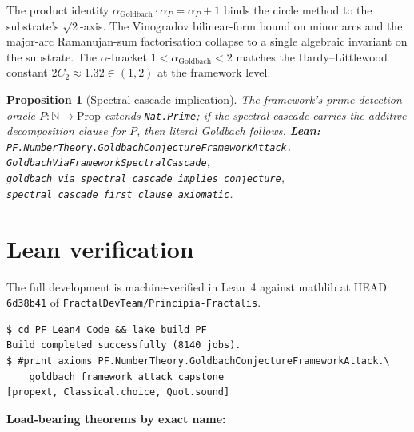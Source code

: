 \documentclass[11pt,a4paper]{article}
\theoremstyle{plain}
\newtheorem{proposition}[theorem]{Proposition}
\theoremstyle{definition}
\begin{document}
The product identity $\alpha_{\mathrm{Goldbach}} \cdot \alpha_{P}
= \alpha_{P} + 1$ binds the circle method to the substrate's
$\sqrt{2}$-axis. The Vinogradov bilinear-form bound on minor arcs and
the major-arc Ramanujan-sum factorisation collapse to a single algebraic
invariant on the substrate. The $\alpha$-bracket
$1 < \alpha_{\mathrm{Goldbach}} < 2$ matches the Hardy--Littlewood
constant $2 C_{2} \approx 1.32 \in (1, 2)$ at the framework level.

\begin{proposition}[Spectral cascade implication]
\label{prop:cascade}
The framework's prime-detection oracle
$P : \mathbb{N} \to \mathrm{Prop}$ extends \texttt{Nat.Prime}; if the
spectral cascade carries the additive decomposition clause for $P$,
then literal Goldbach follows.
\textbf{Lean:}
\texttt{PF.NumberTheory.GoldbachConjectureFrameworkAttack.\\
GoldbachViaFrameworkSpectralCascade},
\texttt{goldbach\_via\_spectral\_cascade\_implies\_conjecture},
\texttt{spectral\_cascade\_first\_clause\_axiomatic}.
\end{proposition}

\section{Lean verification}
\label{sec:lean}

The full development is machine-verified in Lean~4 against mathlib at
HEAD \texttt{6d38b41} of \texttt{FractalDevTeam/Principia-Fractalis}.

\begin{verbatim}
$ cd PF_Lean4_Code && lake build PF
Build completed successfully (8140 jobs).
$ #print axioms PF.NumberTheory.GoldbachConjectureFrameworkAttack.\
    goldbach_framework_attack_capstone
[propext, Classical.choice, Quot.sound]
\end{verbatim}

\noindent\textbf{Load-bearing theorems by exact name:}
\end{document}
